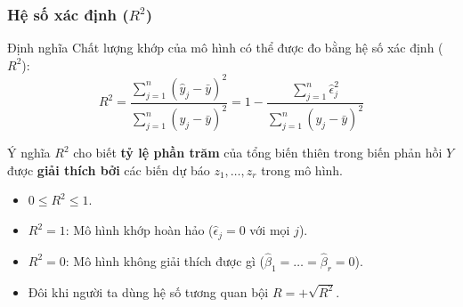 \begin{frame}
    \frametitle{Hệ số xác định ($R^2$)}

    \begin{block}{Định nghĩa}
        Chất lượng khớp của mô hình có thể được đo bằng hệ số xác định ($R^2$):
        \begin{equation*}
            R^2 =  \frac{\sum_{j=1}^{n} (\hat{y}_j - \bar{y})^2}{\sum_{j=1}^{n} (y_j - \bar{y})^2} = 1 - \frac{\sum_{j=1}^{n} \hat{\epsilon}_j^2}{\sum_{j=1}^{n} (y_j - \bar{y})^2}
        \end{equation*}
    \end{block}

    \pause

    \begin{block}{Ý nghĩa}
        $R^2$ cho biết \textbf{tỷ lệ phần trăm} của tổng biến thiên trong biến phản hồi $Y$ được \textbf{giải thích bởi} các biến dự báo $z_1, \dots, z_r$ trong mô hình.
    \end{block}

    \pause

    \begin{itemize}
        \item $0 \le R^2 \le 1$.
        \item $R^2 = 1$: Mô hình khớp hoàn hảo ($\hat{\epsilon}_j = 0$ với mọi $j$).
        \item $R^2 = 0$: Mô hình không giải thích được gì ($\hat{\beta}_1 = \dots = \hat{\beta}_r = 0$).
        \item Đôi khi người ta dùng hệ số tương quan bội $R = +\sqrt{R^2}$.
    \end{itemize}

\end{frame}


